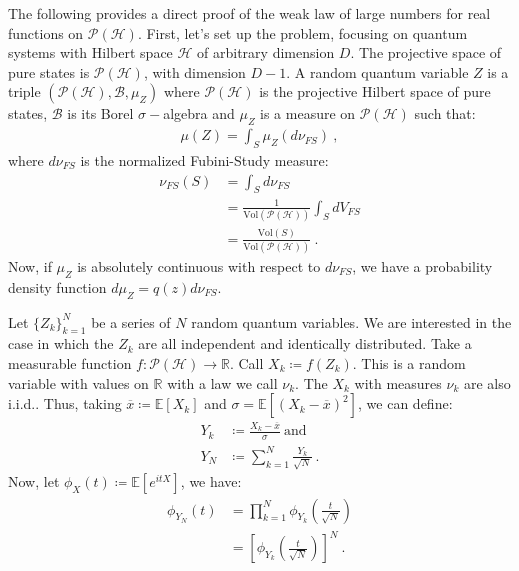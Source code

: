\documentclass[draft,nofootinbib,pre,twocolumn,showkeys,superscriptaddress,preprintnumbers,floatfix]{revtex4-1}
\newcommand{\1}{\mathbbm{1}}
\newcommand{\PH}{\mathcal{P}(\mathcal{H})}
\begin{document}
The following provides a direct proof of the weak law of large numbers for real
functions on $\PH$. First, let's set up the problem, focusing on quantum
systems with Hilbert space $\mathcal{H}$ of arbitrary dimension $D$. The
projective space of pure states is $\PH$, with dimension $D-1$. A random
quantum variable $Z$ is a triple $(\PH,\mathcal{B},\mu_Z)$ where $\PH$ is the
projective Hilbert space of pure states, $\mathcal{B}$ is its Borel
$\sigma-$algebra and $\mu_Z$ is a measure on $\PH$ such that:
\begin{align*}
\mu(Z) = \int_S \mu_Z(d\nu_{FS})
  ~, 
\end{align*}
where $d\nu_{FS}$ is the normalized Fubini-Study measure:
\begin{align*}
\nu_{FS}(S) & = \int_S d\nu_{FS} \\
  & =\frac{1}{\mathrm{Vol}(\PH)} \int_S dV_{FS} \\
  & =  \frac{\mathrm{Vol}(S)}{\mathrm{Vol}(\PH)}
  ~.
\end{align*}
Now, if $\mu_Z$ is absolutely continuous with respect to $d\nu_{FS}$, we have a
probability density function $d\mu_{Z} = q(z)d\nu_{FS}$.

Let $\{Z_k\}_{k=1}^N$ be a series of $N$ random quantum variables. We are
interested in the case in which the $Z_k$ are all independent and identically
distributed. Take a measurable function $f : \PH \to \mathbb{R}$. Call $X_k
\coloneqq f(Z_k)$. This is a random variable with values on $\mathbb{R}$ with a
law we call $\nu_k$. The $X_k$ with measures $\nu_k$ are also i.i.d.. Thus,
taking $\overline{x}\coloneqq \mathbb{E}[X_k]$ and $\sigma = \mathbb{E}[(X_k -
\overline{x})^2]$, we can define:
\begin{align*}
Y_k & \coloneqq \frac{X_k - \overline{x}}{\sigma}~\text{and} \\
  Y_N & \coloneqq \sum_{k=1}^N \frac{Y_k}{\sqrt{N}}
  ~.
\end{align*}
Now, let $\phi_X(t) \coloneqq \mathbb{E}[e^{itX}]$, we have:
\begin{align*}
\phi_{Y_N}(t) & = \prod_{k=1}^N \phi_{Y_k}(\frac{t}{\sqrt{N}}) \\
  & = \left[\phi_{Y_k}(\frac{t}{\sqrt{N}}) \right]^N
  ~.
\end{align*}
\end{document}
